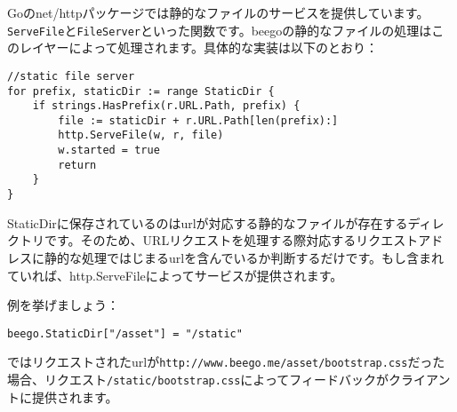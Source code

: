 Goのnet/httpパッケージでは静的なファイルのサービスを提供しています。\texttt{ServeFile}と\texttt{FileServer}といった関数です。beegoの静的なファイルの処理はこのレイヤーによって処理されます。具体的な実装は以下のとおり：

\begin{lstlisting}[numbers=none]
//static file server
for prefix, staticDir := range StaticDir {
    if strings.HasPrefix(r.URL.Path, prefix) {
        file := staticDir + r.URL.Path[len(prefix):]
        http.ServeFile(w, r, file)
        w.started = true
        return
    }
}
\end{lstlisting}

StaticDirに保存されているのはurlが対応する静的なファイルが存在するディレクトリです。そのため、URLリクエストを処理する際対応するリクエストアドレスに静的な処理ではじまるurlを含んでいるか判断するだけです。もし含まれていれば、http.ServeFileによってサービスが提供されます。

例を挙げましょう：

\begin{lstlisting}[numbers=none]
beego.StaticDir["/asset"] = "/static"
\end{lstlisting}


ではリクエストされたurlが\texttt{http://www.beego.me/asset/bootstrap.css}だった場合、リクエスト\texttt{/static/bootstrap.css}によってフィードバックがクライアントに提供されます。
